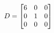 \documentclass[preview]{standalone}
\begin{document}
\begin{align*}
\special{dvisvgm:raw <g id='unique000'>}D = \begin{bmatrix} 6 & 0 & 0 \\ 0 & 1 & 0 \\ 0 & 0 & 0 \end{bmatrix}\special{dvisvgm:raw </g>}
\end{align*}
\end{document}
